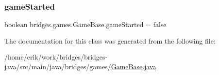 \mbox{\label{classbridges_1_1games_1_1_game_base_a762327b538bd37afc7ca58e10f15a42c}} 
\subsubsection{\texorpdfstring{game\+Started}{gameStarted}}
{\footnotesize\ttfamily boolean bridges.\+games.\+Game\+Base.\+game\+Started = false\hspace{0.3cm}{\ttfamily [protected]}}



The documentation for this class was generated from the following file\+:\begin{DoxyCompactItemize}
\item 
/home/erik/work/bridges/bridges-\/java/src/main/java/bridges/games/\hyperlink{_game_base_8java}{Game\+Base.\+java}\end{DoxyCompactItemize}
